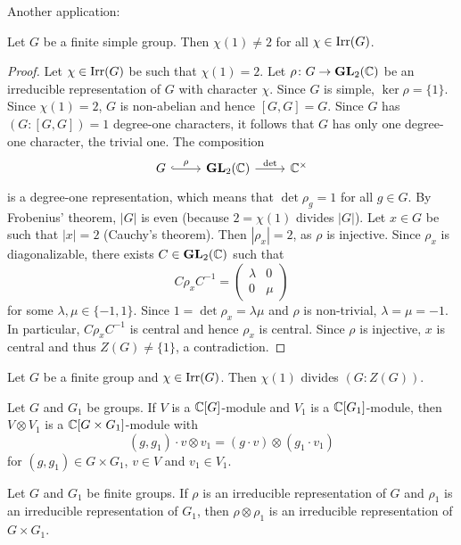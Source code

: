 Another application:

\begin{theorem}
    Let $G$ be a finite simple group. 
    Then $\chi(1)\ne2$ for all $\chi\in\operatorname{Irr}(G)$. 
\end{theorem}

\begin{proof}
    Let $\chi\in\operatorname{Irr}(G)$ be such that $\chi(1)=2$. Let $\rho\colon G\to\mathbf{GL}_2(\mathbb{C})$
    be an irreducible representation of $G$ with character $\chi$. Since 
    $G$ is simple, $\ker\rho=\{1\}$. Since $\chi(1)=2$, 
    $G$ is non-abelian and hence $[G,G]=G$. Since 
    $G$ has $(G:[G,G])=1$ degree-one characters, it follows that
    $G$ has only one degree-one character, the trivial one. The composition
    \[
    \begin{tikzcd}
    	G & {\GL_2(\C)} & {\C^{\times}}
    	\arrow["{\rho }", hook, from=1-1, to=1-2]
    	\arrow["{\det }", from=1-2, to=1-3]
    \end{tikzcd}
    \]
    is a degree-one representation, which means that $\det\rho_g=1$ for all $g\in G$. 
    By Frobenius' theorem, $|G|$ is even (because 
    $2=\chi(1)$ divides $|G|$). Let $x\in G$ be such that $|x|=2$ (Cauchy's theorem). 
    Then $|\rho_x|=2$, as $\rho$ is injective. Since $\rho_x$ is diagonalizable, 
    there exists $C\in\mathbf{GL}_2(\mathbb{C})$ such that
    \[
    C\rho_xC^{-1}=\begin{pmatrix}
    \lambda&0\\
    0&\mu
    \end{pmatrix}
    \]
    for some $\lambda,\mu\in\{-1,1\}$. Since $1=\det\rho_x=\lambda\mu$ and
    $\rho$ is non-trivial, $\lambda=\mu=-1$. In particular, $C\rho_xC^{-1}$ is central
    and hence $\rho_x$ is central. Since $\rho$ is injective, $x$ is central 
    and thus $Z(G)\ne\{1\}$, a contradiction. 
\end{proof}


\begin{theorem}[Schur]
\label{thm:Schur_chi(1)}
    Let $G$ be a finite group and $\chi\in\operatorname{Irr}(G)$. 
    Then $\chi(1)$ divides $(G:Z(G))$. 
\end{theorem}

Let $G$ and $G_1$ be groups. If $V$ is a $\mathbb{C}[G]$-module and 
$V_1$ is a $\mathbb{C}[G_1]$-module, then 
$V\otimes V_1$ is a $\mathbb{C}[G\times G_1]$-module 
with 
\[
(g,g_1)\cdot v\otimes v_1=(g\cdot v)\otimes (g_1\cdot v_1)
\]
for $(g,g_1)\in G\times G_1$, $v\in V$ and $v_1\in V_1$. 

\begin{lemma}
    Let $G$ and $G_1$ be finite groups. If $\rho$ is an irreducible
    representation of $G$ and $\rho_1$ is an irreducible representation
    of $G_1$, then 
    $\rho\otimes\rho_1$ is an irreducible representation of $G\times G_1$. 
\end{lemma}

